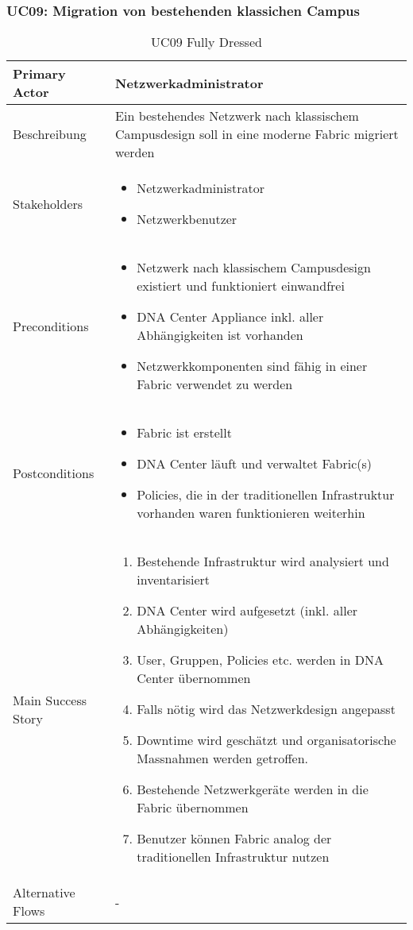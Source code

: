 \subsubsection{UC09: Migration von bestehenden klassichen Campus}
\begin{table}[H]
	\centering
	\begin{tabularx}{\textwidth}{l | X}
		Primary Actor   & Netzwerkadministrator       \\
		\hline
		Beschreibung   & Ein bestehendes Netzwerk nach klassischem Campusdesign soll in eine moderne Fabric migriert werden  \\ 
		\hline
		Stakeholders       & 
		\begin{itemize}
			\item Netzwerkadministrator
			\item Netzwerkbenutzer
		\end{itemize} \\ 
		Preconditions      &
		\begin{itemize}	
			\item Netzwerk nach klassischem Campusdesign existiert und funktioniert einwandfrei
			\item DNA Center Appliance inkl. aller Abhängigkeiten ist vorhanden
			\item Netzwerkkomponenten sind fähig in einer Fabric verwendet zu werden
		\end{itemize}  \\
		\hline
		Postconditions     & 
		\begin{itemize}	
			\item Fabric ist erstellt
			\item DNA Center läuft und verwaltet Fabric(s)
			\item Policies, die in der traditionellen Infrastruktur vorhanden waren funktionieren weiterhin
		\end{itemize}  \\
		\hline
		Main Success Story & 
		\begin{enumerate}
			\item Bestehende Infrastruktur wird analysiert und inventarisiert
			\item DNA Center wird aufgesetzt (inkl. aller Abhängigkeiten)
			\item User, Gruppen, Policies etc. werden in DNA Center übernommen
			\item Falls nötig wird das Netzwerkdesign angepasst
			\item Downtime wird geschätzt und organisatorische Massnahmen werden getroffen. 
			\item Bestehende Netzwerkgeräte werden in die Fabric übernommen
			\item Benutzer können Fabric analog der traditionellen Infrastruktur nutzen
		\end{enumerate}
		\\
		\hline
		Alternative Flows  & -
	\end{tabularx}
	\caption{UC09 Fully Dressed}
	\label{tab:UC09}
\end{table}

